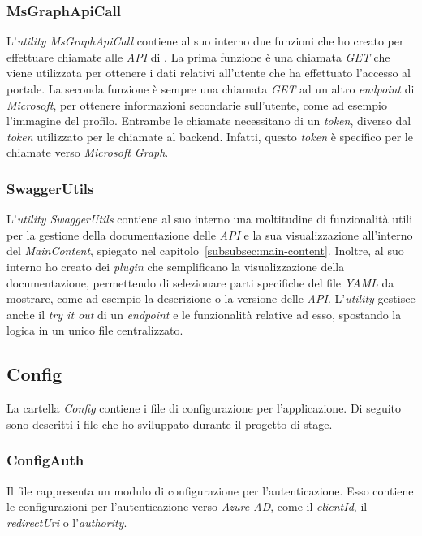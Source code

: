 \subsubsection{MsGraphApiCall}\label{subsubsec:ms-graph-api-call}
L'\textit{utility MsGraphApiCall} contiene al suo interno due funzioni che ho creato per effettuare chiamate alle \textit{API} di . 
La prima funzione è una chiamata \textit{GET} che viene utilizzata per ottenere i dati relativi all'utente che ha effettuato l'accesso al portale.
La seconda funzione è sempre una chiamata \textit{GET} ad un altro \textit{endpoint} di \textit{Microsoft}, per ottenere informazioni secondarie sull'utente, come ad esempio l'immagine del profilo.
Entrambe le chiamate necessitano di un \textit{token}, diverso dal \textit{token} utilizzato per le chiamate al backend. Infatti, questo \textit{token} è specifico per le chiamate verso \textit{Microsoft Graph}.

\subsubsection{SwaggerUtils}\label{subsubsec:swagger-utils}
L'\textit{utility SwaggerUtils} contiene al suo interno una moltitudine di funzionalità utili per la gestione della documentazione delle \textit{API} e la sua visualizzazione all'interno
del \textit{MainContent}, spiegato nel capitolo~\ref{subsubsec:main-content}.
Inoltre, al suo interno ho creato dei \textit{plugin} che semplificano la visualizzazione della documentazione, permettendo di selezionare parti specifiche del file \textit{YAML} da mostrare, come ad esempio la descrizione o la versione delle \textit{API}.
L'\textit{utility} gestisce anche il \textit{try it out} di un \textit{endpoint} e le funzionalità relative ad esso, spostando la logica in un unico file centralizzato.
\pagebreak


\subsection{Config}\label{subsec:config}
La cartella \textit{Config} contiene i file di configurazione per l'applicazione. Di seguito sono descritti i file che ho sviluppato durante il progetto di stage.
\subsubsection{ConfigAuth}\label{subsubsec:config-auth}
Il file rappresenta un modulo di configurazione per l'autenticazione. Esso contiene le configurazioni per l'autenticazione verso \textit{Azure AD},
come il \textit{clientId}, il \textit{redirectUri} o l'\textit{authority}.  

